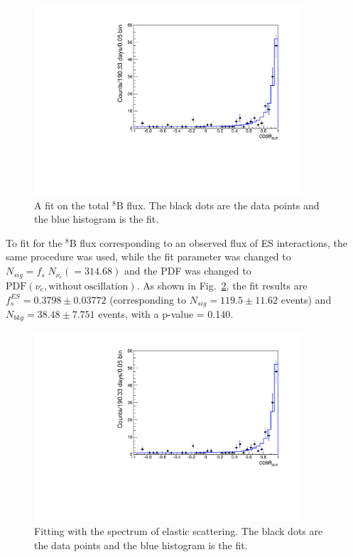 \begin{figure}[!htb]
	\centering
	\includegraphics[width=10cm]{TotalFluxFit.pdf}
	\caption[A fit on the total $^8$B flux.]{A fit on the total $^8$B flux. The black dots are the data points and the blue histogram is the fit.\label{fig:TOTALfluxFit}}
\end{figure}

To fit for the $^8$B flux corresponding to an observed flux of ES interactions, the same procedure was used, while the fit parameter was changed to $N_{sig}=f_s \; N_{\nu_e}(=314.68)$ and the PDF was changed to $\mathrm{PDF}(\nu_e,\mathrm{without~oscillation})$. As shown in Fig.~\ref{fig:ESfluxFit}, the fit results are $f^{ES}_s=0.3798\pm 0.03772$ (corresponding to $N_{sig}=119.5\pm11.62$ events) and $N_{bkg}=38.48\pm 7.751$ events, with a p-value = 0.140.

\begin{figure}[!htb]
	\centering
	\includegraphics[width=10cm]{ESfluxFit.pdf}
	\caption[Fitting with the spectrum of elastic scattering.]{Fitting with the spectrum of elastic scattering. The black dots are the data points and the blue histogram is the fit.\label{fig:ESfluxFit}}
\end{figure}


